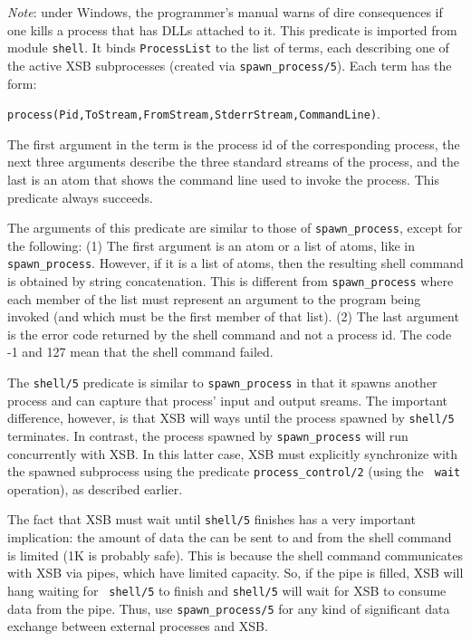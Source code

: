 \begin{description}
    \emph{Note}: under Windows, the programmer's manual warns of dire
    consequences if one kills a process that has DLLs attached to it.
%
    This predicate is imported from module {\tt shell}.
    It binds {\tt ProcessList} to the list of terms, each describing one of
    the active XSB subprocesses (created via \verb|spawn_process/5|).
    Each term has the form:
    \begin{center}
      \verb|process(Pid,ToStream,FromStream,StderrStream,CommandLine)|. 
    \end{center}
    The first argument in the term is the process id of the corresponding
    process, the next three arguments describe the three standard streams
    of the process, and the last is an atom that shows the command line used
    to invoke the process.
    This predicate always succeeds.

%
The arguments of this predicate are similar to those of
\verb|spawn_process|, except for the following: (1) The first argument
is an atom or a list of atoms, like in \verb|spawn_process|. However,
if it is a list of atoms, then the resulting shell command is obtained
by string concatenation. This is different from \verb|spawn_process|
where each member of the list must represent an argument to the
program being invoked (and which must be the first member of that
list).  (2) The last argument is the error code returned by the shell
command and not a process id. The code -1 and 127 mean that the shell
command failed.
    
    The {\tt shell/5} predicate is similar to \verb|spawn_process| in
    that it spawns another process and can capture that process' input
    and output sreams.
%    
    The important difference, however, is that XSB will ways until the
    process spawned by {\tt shell/5} terminates. In contrast, the process
    spawned by \verb|spawn_process| will run concurrently with XSB.  In
    this latter case, XSB must explicitly synchronize with the spawned
    subprocess using the predicate \verb|process_control/2| (using the {\tt
      wait} operation), as described earlier.
    
    The fact that XSB must wait until {\tt shell/5} finishes has a very
    important implication: the amount of data the can be sent to and from
    the shell command is limited (1K is probably safe). This is because the
    shell command communicates with XSB via pipes, which have limited
    capacity.  So, if the pipe is filled, XSB will hang waiting for {\tt
      shell/5} to finish and {\tt shell/5} will wait for XSB to consume data
    from the pipe.  Thus, use \verb|spawn_process/5| for any kind of
    significant data exchange between external processes and XSB.
  

\end{description}
